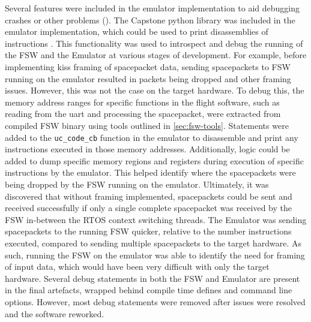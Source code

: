 \documentclass[../report.tex]{subfiles}
\begin{document}
Several features were included in the emulator implementation to aid debugging
crashes or other problems (). The Capstone python library was
included in the emulator implementation, which could be used to print
disassemblies of instructions \citep{Capstone}. This functionality was used to
introspect and debug the running of the FSW and the Emulator at various stages
of development. For example, before implementing kiss framing of spacepacket
data, sending spacepackets to FSW running on the emulator resulted in packets
being dropped and other framing issues. However, this was not the case on the
target hardware. To debug this, the memory address ranges for specific
functions in the flight software, such as reading from the uart and processing
the spacepacket, were extracted from compiled FSW binary using tools outlined
in \autoref{sec:fsw-tools}. Statements were added to the
\lstinline|uc_code_cb| function in the emulator to disassemble and print any
instructions executed in those memory addresses. Additionally, logic could be
added to dump specific memory regions and registers during execution of
specific instructions by the emulator. This helped identify where the
spacepackets were being dropped by the FSW running on the emulator. Ultimately,
it was discovered that without framing implemented, spacepackets could be sent
and received successfully if only a single complete spacepacket was received by
the FSW in-between the RTOS context switching threads. The Emulator was sending
spacepackets to the running FSW quicker, relative to the number instructions
executed, compared to sending multiple spacepackets to the target hardware. As
such, running the FSW on the emulator was able to identify the need for framing
of input data, which would have been very difficult with only the target
hardware. Several debug statements in both the FSW and Emulator are present in
the final artefacts, wrapped behind compile time defines and command line
options. However, most debug statements were removed after issues were resolved
and the software reworked.

\end{document}
